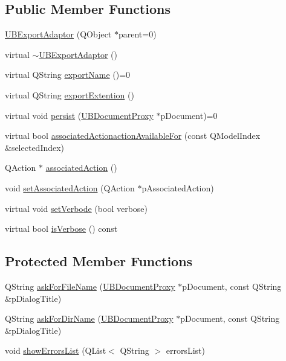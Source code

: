 \subsection*{Public Member Functions}
\begin{DoxyCompactItemize}
\item 
\hyperlink{class_u_b_export_adaptor_aaca09f974c79a54ea09cdc6867de4021}{U\-B\-Export\-Adaptor} (Q\-Object $\ast$parent=0)
\item 
virtual \hyperlink{class_u_b_export_adaptor_a3f639b90ece4d9f84b9d5856651fd709}{$\sim$\-U\-B\-Export\-Adaptor} ()
\item 
virtual Q\-String \hyperlink{class_u_b_export_adaptor_a899c4b6a2431b5bc9da7a053a475ef80}{export\-Name} ()=0
\item 
virtual Q\-String \hyperlink{class_u_b_export_adaptor_a4627b5f14336f1a52dae470a45bf4a97}{export\-Extention} ()
\item 
virtual void \hyperlink{class_u_b_export_adaptor_a9333b1d118d0bf445acbda90ae35135d}{persist} (\hyperlink{class_u_b_document_proxy}{U\-B\-Document\-Proxy} $\ast$p\-Document)=0
\item 
virtual bool \hyperlink{class_u_b_export_adaptor_a0ab1b01c053f3e342276a3fe526652b4}{associated\-Actionaction\-Available\-For} (const Q\-Model\-Index \&selected\-Index)
\item 
Q\-Action $\ast$ \hyperlink{class_u_b_export_adaptor_af7bfa611557d5888fa57146cbc26eb27}{associated\-Action} ()
\item 
void \hyperlink{class_u_b_export_adaptor_a3e998cf72ad5ac921d588714bcaff783}{set\-Associated\-Action} (Q\-Action $\ast$p\-Associated\-Action)
\item 
virtual void \hyperlink{class_u_b_export_adaptor_ad1c81c7aca05513cb4ea5611c55e3075}{set\-Verbode} (bool verbose)
\item 
virtual bool \hyperlink{class_u_b_export_adaptor_abccdf6766ee57761a9d0e896f64e212e}{is\-Verbose} () const 
\end{DoxyCompactItemize}
\subsection*{Protected Member Functions}
\begin{DoxyCompactItemize}
\item 
Q\-String \hyperlink{class_u_b_export_adaptor_aad55193e5c640cbf06bb5ab486d2b253}{ask\-For\-File\-Name} (\hyperlink{class_u_b_document_proxy}{U\-B\-Document\-Proxy} $\ast$p\-Document, const Q\-String \&p\-Dialog\-Title)
\item 
Q\-String \hyperlink{class_u_b_export_adaptor_a73efa8baa12dbd72b1b3e3e9a04ca1d7}{ask\-For\-Dir\-Name} (\hyperlink{class_u_b_document_proxy}{U\-B\-Document\-Proxy} $\ast$p\-Document, const Q\-String \&p\-Dialog\-Title)
\item 
void \hyperlink{class_u_b_export_adaptor_a6d6f072b3dfdc144409527ca7be57951}{show\-Errors\-List} (Q\-List$<$ Q\-String $>$ errors\-List)
\end{DoxyCompactItemize}
